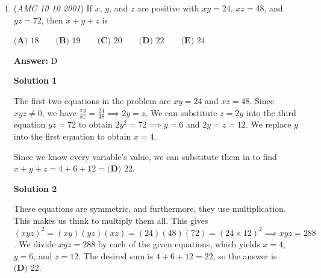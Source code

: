 \begin{enumerate}
 \textbf{Answer: }B



\textbf{Solution 1}

Let $A$, $T$ be Kristin's annual income and the income tax total, respectively. Notice that
 \begin{align*} T &= p\%\cdot28000 + (p + 2)\%\cdot(A - 28000) \\ &= [p\%\cdot28000 + p\%\cdot(A - 28000)] + 2\%\cdot(A - 28000) \\ &= p\%\cdot A + 2\%\cdot(A - 28000) \end{align*}
We are also given that 
 \[T = (p + 0.25)\%\cdot A = p\%\cdot A + 0.25\%\cdot A\]Thus, 
 \[p\%\cdot A + 2\%\cdot(A - 28000) = p\%\cdot A + 0.25\%\cdot A\] 
 \[2\%\cdot(A - 28000) = 0.25\%\cdot A\]Solve for $A$ to obtain $A = \boxed{\textbf{(B) }\textdollar 32000}$.

 Note: You may also assume p = 0 for easy calculation.

 


	\item (\textit{AMC 10 10 2001}) If $x$, $y$, and $z$ are positive with $xy = 24$, $xz = 48$, and $yz = 72$, then $x + y + z$ is


 $\textbf{(A) }18\qquad\textbf{(B) }19\qquad\textbf{(C) }20\qquad\textbf{(D) }22\qquad\textbf{(E) }24$

 \textbf{Answer: }D



\textbf{Solution 1}

The first two equations in the problem are $xy=24$ and $xz=48$. Since $xyz \ne 0$, we have $\frac{xy}{xz}=\frac{24}{48} \implies 2y=z$. We can substitute $z = 2y$ into the third equation $yz = 72$ to obtain $2y^2=72 \implies y=6$ and $2y=z=12$. We replace $y$ into the first equation to obtain $x=4$.

 Since we know every variable's value, we can substitute them in to find $x+y+z = 4+6+12 = \boxed{\textbf{(D) }22}$.

 



\textbf{Solution 2}

These equations are symmetric, and furthermore, they use multiplication. This makes us think to multiply them all. This gives $(xyz)^2 = (xy)(yz)(xz) = (24)(48)(72) = (24 \times 12)^2 \implies xyz = 288$. We divide $xyz = 288$ by each of the given equations, which yields $x = 4$, $y = 6$, and $z = 12$. The desired sum is $4+6+12 = 22$, so the answer is $\boxed{\textbf{(D) } 22}$.


\end{enumerate}
